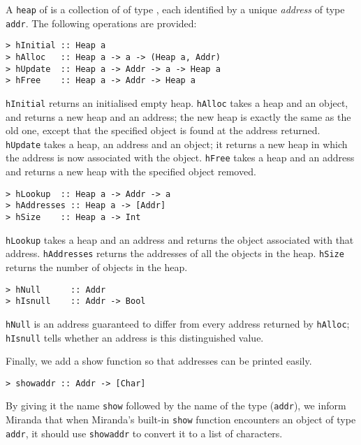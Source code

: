 A \mbox{\tt heap} of \mbox{\tt *} is a collection of  of type \mbox{\tt *}, each
identified by a
unique {\em address\/} of type \mbox{\tt addr}.
The following operations are provided:
\begin{verbatim}
> hInitial :: Heap a
> hAlloc   :: Heap a -> a -> (Heap a, Addr)
> hUpdate  :: Heap a -> Addr -> a -> Heap a
> hFree    :: Heap a -> Addr -> Heap a
\end{verbatim}
%
%
%
%
\mbox{\tt hInitial} returns an initialised empty heap.
\mbox{\tt hAlloc} takes a heap and an object, and returns a new heap and an address;
the new heap is exactly the same as the old one, except that
the specified object is found at the address returned.
\mbox{\tt hUpdate} takes a heap, an address and an object;
it returns a new heap in which the address is now
associated with the object.
\mbox{\tt hFree} takes a heap and an address and returns a new heap with
the specified object removed.
\begin{verbatim}
> hLookup  :: Heap a -> Addr -> a
> hAddresses :: Heap a -> [Addr]
> hSize    :: Heap a -> Int
\end{verbatim}
%
%
%
\mbox{\tt hLookup} takes a heap and an address and returns the
object associated with that address.
\mbox{\tt hAddresses} returns the addresses of all the objects in the heap.
\mbox{\tt hSize} returns the number of objects in the heap.
\begin{verbatim}
> hNull      :: Addr
> hIsnull    :: Addr -> Bool
\end{verbatim}
%
%
\mbox{\tt hNull} is an address guaranteed to differ from every address returned
by \mbox{\tt hAlloc}; \mbox{\tt hIsnull} tells whether an address is this distinguished
value.

Finally, we add a show function so that addresses can be printed easily.
\begin{verbatim}
> showaddr :: Addr -> [Char]
\end{verbatim}
%
By giving it the name \mbox{\tt show} followed by the name of the type (\mbox{\tt addr}),
we inform Miranda that when Miranda's built-in \mbox{\tt show} function encounters
an object of type \mbox{\tt addr}, it should use \mbox{\tt showaddr} to convert it to a list
of characters.

